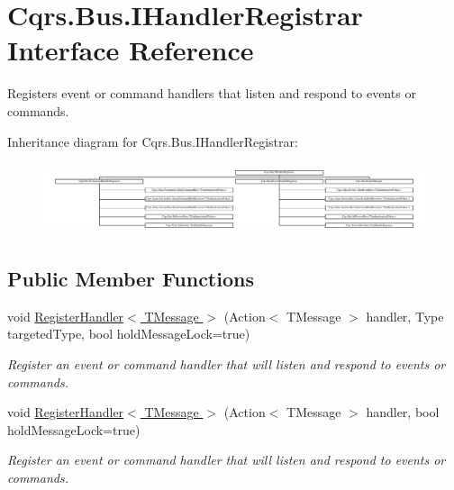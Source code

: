 \hypertarget{interfaceCqrs_1_1Bus_1_1IHandlerRegistrar}{}\section{Cqrs.\+Bus.\+I\+Handler\+Registrar Interface Reference}
\label{interfaceCqrs_1_1Bus_1_1IHandlerRegistrar}


Registers event or command handlers that listen and respond to events or commands.  


Inheritance diagram for Cqrs.\+Bus.\+I\+Handler\+Registrar\+:\begin{figure}[H]
\begin{center}
\leavevmode
\includegraphics[height=2.116631cm]{interfaceCqrs_1_1Bus_1_1IHandlerRegistrar}
\end{center}
\end{figure}
\subsection*{Public Member Functions}
\begin{DoxyCompactItemize}
\item 
void \hyperlink{interfaceCqrs_1_1Bus_1_1IHandlerRegistrar_ab6ca4dfdc54a5aeebe4651dbdb479f55}{Register\+Handler$<$ T\+Message $>$} (Action$<$ T\+Message $>$ handler, Type targeted\+Type, bool hold\+Message\+Lock=true)
\begin{DoxyCompactList}\small\item\em Register an event or command handler that will listen and respond to events or commands. \end{DoxyCompactList}\item 
void \hyperlink{interfaceCqrs_1_1Bus_1_1IHandlerRegistrar_a07792dcc9a8b272709ff2e2dd336a642}{Register\+Handler$<$ T\+Message $>$} (Action$<$ T\+Message $>$ handler, bool hold\+Message\+Lock=true)
\begin{DoxyCompactList}\small\item\em Register an event or command handler that will listen and respond to events or commands. \end{DoxyCompactList}\end{DoxyCompactItemize}


